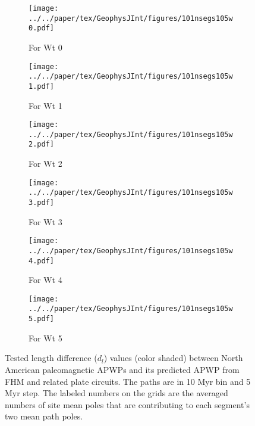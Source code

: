 \begin{figure}[!ht]
	\centering
	\begin{subfigure}{.495\textwidth}
		\texttt{[image: ../../paper/tex/GeophysJInt/figures/101nsegs105w0.pdf]}
		\caption{For Wt 0}\label{fig-na-dlw0}
	\end{subfigure}
	\vspace{.1em}
	\begin{subfigure}{.495\textwidth}
		\texttt{[image: ../../paper/tex/GeophysJInt/figures/101nsegs105w1.pdf]}
		\caption{For Wt 1}\label{fig-na-dlw1}
	\end{subfigure}
	\vspace{.1em}
	\begin{subfigure}{.495\textwidth}
		\texttt{[image: ../../paper/tex/GeophysJInt/figures/101nsegs105w2.pdf]}
		\caption{For Wt 2}\label{fig-na-dlw2}
	\end{subfigure}
	\vspace{.1em}
	\begin{subfigure}{.495\textwidth}
		\texttt{[image: ../../paper/tex/GeophysJInt/figures/101nsegs105w3.pdf]}
		\caption{For Wt 3}\label{fig-na-dlw3}
	\end{subfigure}
	\vspace{.1em}
	\begin{subfigure}{.495\textwidth}
		\texttt{[image: ../../paper/tex/GeophysJInt/figures/101nsegs105w4.pdf]}
		\caption{For Wt 4}\label{fig-na-dlw4}
	\end{subfigure}
	\vspace{.1em}
	\begin{subfigure}{.495\textwidth}
		\texttt{[image: ../../paper/tex/GeophysJInt/figures/101nsegs105w5.pdf]}
		\caption{For Wt 5}\label{fig-na-dlw5}
	\end{subfigure}
	\caption[$d_l$ of each pair of segments for North American 10/5 Myr
APWPs]{Tested length difference ($d_l$) values (color shaded) between North
American paleomagnetic APWPs and its predicted APWP from FHM and related plate
circuits. The paths are in 10 Myr bin and 5 Myr step. The labeled numbers on the
grids are the averaged numbers of site mean poles that are contributing to each
segment's two mean path poles.}\label{fig-nadl}
\end{figure}

